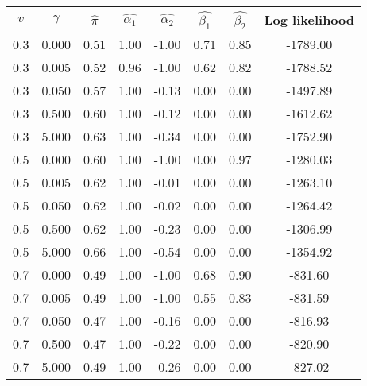 \begin{tabular}{c |c |c |c |c |c |c |c}
$v$ & $\gamma$ & $\hat{\pi}$ & $\hat{\alpha_1}$ & $\hat{\alpha_2}$ & $\hat{\beta_1}$ & $\hat{\beta_2}$ & Log likelihood \\
    \hline
  0.3 & 0.000 & 0.51 & 1.00 & -1.00 & 0.71 & 0.85 & -1789.00 \\
  0.3 & 0.005 & 0.52 & 0.96 & -1.00 & 0.62 & 0.82 & -1788.52 \\
  0.3 & 0.050 & 0.57 & 1.00 & -0.13 & 0.00 & 0.00 & -1497.89 \\
  0.3 & 0.500 & 0.60 & 1.00 & -0.12 & 0.00 & 0.00 & -1612.62 \\
  0.3 & 5.000 & 0.63 & 1.00 & -0.34 & 0.00 & 0.00 & -1752.90 \\
  0.5 & 0.000 & 0.60 & 1.00 & -1.00 & 0.00 & 0.97 & -1280.03 \\
  0.5 & 0.005 & 0.62 & 1.00 & -0.01 & 0.00 & 0.00 & -1263.10 \\
  0.5 & 0.050 & 0.62 & 1.00 & -0.02 & 0.00 & 0.00 & -1264.42 \\
  0.5 & 0.500 & 0.62 & 1.00 & -0.23 & 0.00 & 0.00 & -1306.99 \\
  0.5 & 5.000 & 0.66 & 1.00 & -0.54 & 0.00 & 0.00 & -1354.92 \\
  0.7 & 0.000 & 0.49 & 1.00 & -1.00 & 0.68 & 0.90 & -831.60 \\
  0.7 & 0.005 & 0.49 & 1.00 & -1.00 & 0.55 & 0.83 & -831.59 \\
  0.7 & 0.050 & 0.47 & 1.00 & -0.16 & 0.00 & 0.00 & -816.93 \\
  0.7 & 0.500 & 0.47 & 1.00 & -0.22 & 0.00 & 0.00 & -820.90 \\
  0.7 & 5.000 & 0.49 & 1.00 & -0.26 & 0.00 & 0.00 & -827.02 \\
\end{tabular}
